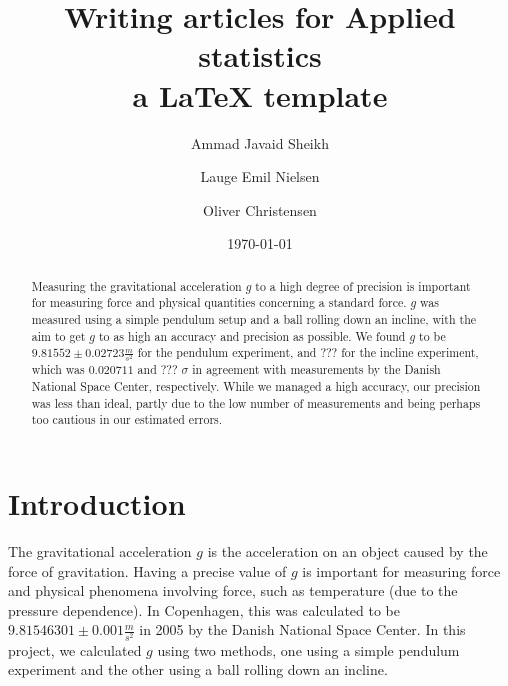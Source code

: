 \documentclass[a4paper,%
aps,%
prl,%
amsfonts,%
amssymb,%
amsmath,%
nobibnotes,%
twocolumn, %
twoside,%
balancelastpage,%
eqsecnum] %
{revtex4-1}
\begin{document}

\title{Writing articles for Applied statistics \\ a \LaTeX
  template} %
\date{\today} %

\author{Ammad Javaid Sheikh} \author{Lauge Emil Nielsen} \author{Oliver
  Christensen}  %

\begin{abstract}
  Measuring the gravitational acceleration $g$ to a high degree of precision is
  important for measuring force and physical quantities concerning a standard
  force. $g$ was measured using a simple pendulum setup and a ball rolling down
  an incline, with the aim to get $g$ to as high an accuracy and precision as
  possible. We found $g$ to be $9.81552 \pm 0.02723 \frac{m}{s^2}$ for the
  pendulum experiment, and ??? for the incline experiment, which was $0.020711$
  and ??? $\sigma$ in agreement with measurements by the Danish National Space
  Center, respectively. While we managed a high accuracy, our precision was less
  than ideal, partly due to the low number of measurements and being perhaps too
  cautious in our estimated errors.
\end{abstract}

\maketitle

\setcounter{section}{1} %
\setcounter{equation}{0} %


\section{Introduction}
The gravitational acceleration $g$ is the acceleration on an object caused by
the force of gravitation. Having a precise value of $g$ is important for
measuring force and physical phenomena involving force, such as temperature (due
to the pressure dependence). In Copenhagen, this was calculated to be
$9.81546301 \pm 0.001 \frac{m}{s^2}$ in 2005 by the Danish National Space
Center.\cite{Gravity2005} In this project, we calculated $g$ using two methods,
one using a simple pendulum experiment and the other using a ball rolling down
an incline.
\end{document}
